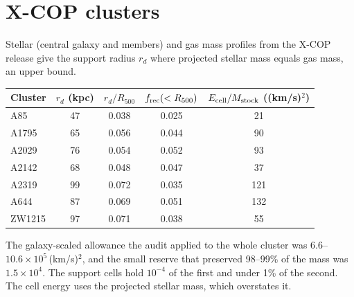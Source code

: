 \documentclass[11pt]{article}
\begin{document}
\section{X-COP clusters}
Stellar (central galaxy and members) and gas mass profiles from the X-COP release give
the support radius $r_d$ where projected stellar mass equals gas mass, an upper bound.
\begin{center}
\begin{tabular}{lcccc}
\toprule
Cluster & $r_d$ (kpc) & $r_d/R_{500}$ & $f_{\rm rec}(<R_{500})$ & $E_{\rm cell}/M_{\rm stock}$ ((km/s)$^2$)\\
\midrule
A85 & 47 & 0.038 & 0.025 & 21\\
A1795 & 65 & 0.056 & 0.044 & 90\\
A2029 & 76 & 0.054 & 0.052 & 93\\
A2142 & 68 & 0.048 & 0.047 & 37\\
A2319 & 99 & 0.072 & 0.035 & 121\\
A644 & 87 & 0.069 & 0.051 & 132\\
ZW1215 & 97 & 0.071 & 0.038 & 55\\
\bottomrule
\end{tabular}
\end{center}
The galaxy-scaled allowance the audit applied to the whole cluster was
$6.6$--$10.6\times10^5$\,(km/s)$^2$, and the small reserve that preserved 98--99\% of the
mass was $1.5\times10^4$. The support cells hold $10^{-4}$ of the first and under 1\% of
the second. The cell energy uses the projected stellar mass, which overstates it.
\end{document}
